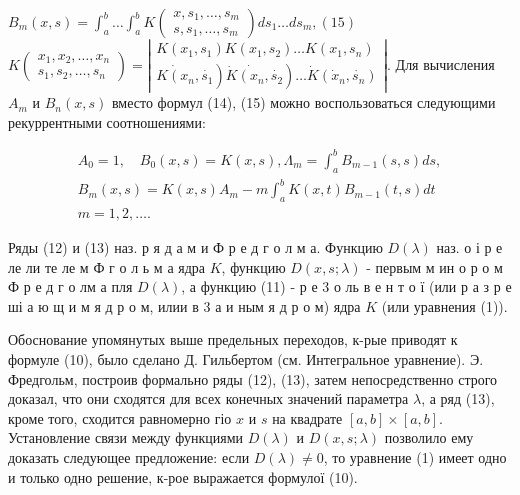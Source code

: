 \documentclass[10pt]{article}
\begin{document}
$B_{m}(x, s)=\int_{a}^{b} \ldots \int_{a}^{b} K\left(\begin{array}{ccc}x, s_{1}, \ldots, s_{m} \\ s, s_{1}, \ldots, s_{m}\end{array}\right) d s_{1} \ldots d s_{m},(15)$ $K\left(\begin{array}{c}x_{1}, x_{2}, \ldots, x_{n} \\ s_{1}, s_{2}, \ldots, s_{n}\end{array}\right)=\left|\begin{array}{c}K\left(x_{1}, s_{1}\right) K\left(x_{1}, s_{2}\right) \ldots K\left(x_{1}, s_{n}\right) \\ \left.\left.\dot{K\left(x_{n}\right.}, \dot{s_{1}}\right) \dot{K} \dot{\left(x_{n}\right.}, \dot{s_{2}}\right) \ldots \dot{K}\left(\dot{x}_{n}, \dot{s_{n}}\right)\end{array}\right|$. Для вычисления $A_{m}$ и $B_{n}(x, s)$ вместо формул (14), (15) можно воспользоваться следующими рекуррентными соотношениями:



\[

\begin{gathered}

A_{0}=1, \quad B_{0}(x, s)=K(x, s), \Lambda_{m}=\int_{a}^{b} B_{m-1}(s, s) d s, \\

B_{m}(x, s)=K(x, s) A_{m}-m \int_{a}^{b} K(x, t) B_{m-1}(t, s) d t \\

m=1,2, \ldots .

\end{gathered}

\]



Ряды (12) и (13) наз. р я д а м и Ф р е д г о л м а. Функцию $D(\lambda)$ наз. о і р е ле ли те ле м Ф г о л ь м а ядра $K$, функцию $D(x, s ; \lambda)$ - первым м ин о р о м Ф р е д г о лм а пля $D(\lambda)$, а функцию (11) - р е 3 о ль в е н т о ї (или р а з р е ші а ю щ и м я д р о м, илии в 3 а и ным я д р о м) ядра $K$ (или уравнения (1)).



Обоснование упомянутых выше предельных переходов, к-рые приводят к формуле (10), было сделано Д. Гильбертом (см. Интегральное уравнение). Э. Фредгольм, построив формально ряды (12), (13), затем непосредственно строго доказал, что они сходятся для всех конечных значений параметра $\lambda$, а ряд (13), кроме того, сходится равномерно гіо $x$ и $s$ на квадрате $[a, b] \times[a, b]$. Установление связи между функциями $D(\lambda)$ и $D(x, s ; \lambda)$ позволило ему доказать следующее предложение: если $D(\lambda) \neq 0$, то уравнение (1) имеет одно и только одно решение, к-рое выражается формулої (10).
\end{document}
